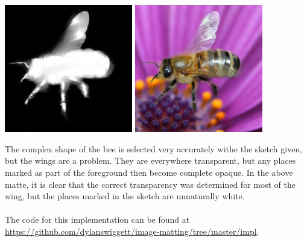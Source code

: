 \begin{center}
\includegraphics[width=2.2in]{fig/bee_result.jpg}
\hspace{.2in}
\includegraphics[width=2.2in]{fig/bee_on_flower.jpg}
\end{center}
The complex shape of the bee is selected very accurately withe the sketch given, but the wings are a problem. They are everywhere transparent, but any places marked as part of the foreground then become complete opaque. In the above matte, it is clear that the correct transparency was determined for most of the wing, but the places marked in the sketch are unnaturally white.
\\\\
The code for this implementation can be found at\\ \url{https://github.com/dylanswiggett/image-matting/tree/master/impl}.